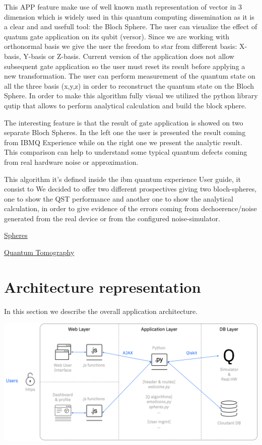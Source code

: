 \documentclass[twoside,twocolumn]{article}
\begin{document}
This APP feature make use of well known math representation of vector in $3$ dimension which is widely used in this quantum computing dissemination as it is a clear and and usefull tool: the Bloch Sphere.
The user can visualize the effect of quatum gate application on its qubit (versor). Since we are working with orthonormal basis we give the user the freedom to star from different basis: X-basis, Y-basis or Z-basis. Current version of the application does not allow subsequent gate application so the user must reset its result before applying a new transformation.
The user can perform measurement of the quantum state on all the three basis (x,y,z)
in order to reconstruct the quantum state on the Bloch Sphere. In order to make this algorithm fully visual we utilized the python library qutip that allows
to perform analytical calculation and build the block sphere.

The interesting feature is that the result of gate application is showed on two separate Bloch Spheres. In the left one the user is presented the result coming from IBMQ Experience while on the right one we present the analytic result. This comparison can help to understand some typical quantum defects coming from real hardware noise or approximation.


This algorithm it's defined inside the ibm quantum experience User guide, it consist to 
We decided to offer two different prospectives giving two bloch-spheres, one to show the QST performance and another one to show the analytical calculation, in order to
give evidence of the errors coming from dechoerence/noise generated from the real device or from the configured noise-simulator.


\href{https://quantumexperience.ng.bluemix.net/proxy/tutorial/full-user-guide/002-The_Weird_and_Wonderful_World_of_the_Qubit/005-The_Bloch_Sphere.html}{Spheres}

\href{https://en.wikipedia.org/wiki/Quantum_tomography}{Quantum Tomography}


\section{Architecture representation}
In this section we describe the overall application architecture. 

\begin{center}
\includegraphics[scale=0.4]{architecture.png}
\end{center}
\end{document}
